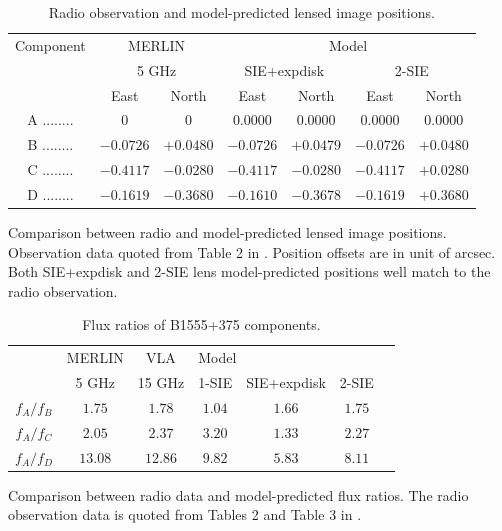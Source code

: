 \documentclass[useAMS,usenatbib]{mn2e}
\begin{document}
\begin{table}
 \begin{minipage}{140mm}
  \caption{Radio observation and model-predicted lensed image positions.}
  \begin{tabular}{@{}ccccccc}

\hline

Component	&\multicolumn{2}{c}{MERLIN} 	 & \multicolumn{4}{c}{Model} \\
					&\multicolumn{2}{c}{5 GHz}		&	\multicolumn{2}{c}{SIE+expdisk} &\multicolumn{2}{c}{ 2-SIE}		\\
					 &East &North &East 		&North &East 		&North\\ 
\hline
A ........ &$0$    		&$0$		&$0.0000$ &$0.0000$   &   $0.0000$   &  $ 0.0000$\\  
B ........ &$-0.0726$ 	&$+0.0480$	&$-0.0726$ &$+0.0479$ & $-0.0726 $  &  $+0.0480$  \\  
C ........ &$-0.4117$  &$-0.0280$	&$-0.4117$ &$-0.0280$  & $-0.4117 $  &   $+0.0280$ \\  
D ........ &$-0.1619$  &$-0.3680$	&$-0.1610$ &$-0.3678$  & $-0.1619$    &  $+0.3680$ \\  
\hline
\end{tabular}

\end{minipage}
\medskip

Comparison between radio and model-predicted lensed image positions. Observation data quoted from Table 2 in \citet{Marlow99}. Position offsets are in unit of arcsec. Both SIE+expdisk and 2-SIE lens model-predicted positions well match to the radio observation.

\end{table}

\begin{table}
  \caption{Flux ratios of B1555+375 components.}
  \begin{tabular}{@{}ccccccc}

\hline
	& MERLIN & VLA & \multicolumn{3}{l}{Model}\\
		&5 GHz & 15 GHz  & 1-SIE & SIE+expdisk & 2-SIE\\
\hline
$f_A/f_B$			&$1.75$ & $1.78$ &$1.04$& $1.66$ & $1.75$ \\ 
$f_A/f_C$		&$2.05$ 	&$2.37$ &$3.20$ & $1.33$ & $2.27$\\
$f_A/f_D$		&$13.08$ &$ 12.86$ &$9.82$& $5.83$ & $8.11$\\

\hline
\end{tabular}

\medskip
Comparison between radio data and model-predicted flux ratios. The radio observation data is quoted from Tables 2 and Table 3 in \citet{Marlow99}. 

\end{table}
\end{document}
